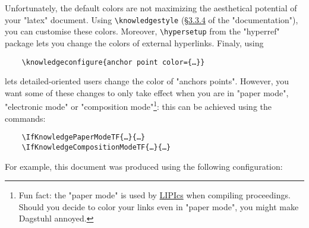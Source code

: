 \documentclass{article}
\begin{document}
Unfortunately, the default colors are not maximizing the aesthetical
potential of your "latex" document.
Using \verb|\knowledgestyle| (\href{https://distrib-coffee.ipsl.jussieu.fr/pub/mirrors/ctan/macros/latex/contrib/knowledge/knowledge.pdf#subsubsection.3.3.4}{§3.3.4} of the "documentation"), you can customise these colors. Moreover,
\verb|\hypersetup| from the "hyperref" package lets you change the colors of
external hyperlinks. Finaly, using
\begin{verbatim}
    \knowledgeconfigure{anchor point color={…}}
\end{verbatim}
lets detailed-oriented users change the color of "anchors points".
However, you want some of these changes to only take effect when you are in
"paper mode", "electronic mode" or "composition mode"\footnote{Fun fact:
the "paper mode" is used by \href{https://www.dagstuhl.de/en/publications/lipics}{LIPIcs} when compiling proceedings. Should you decide
to color your links even in "paper mode", you might make Dagstuhl annoyed.}:
this can be achieved using the commands:
\begin{verbatim}
    \IfKnowledgePaperModeTF{…}{…}
    \IfKnowledgeCompositionModeTF{…}{…}
\end{verbatim}

For example, this document was produced using the following configuration:
\begin{spverbatim}
    
\end{spverbatim}
\end{document}
